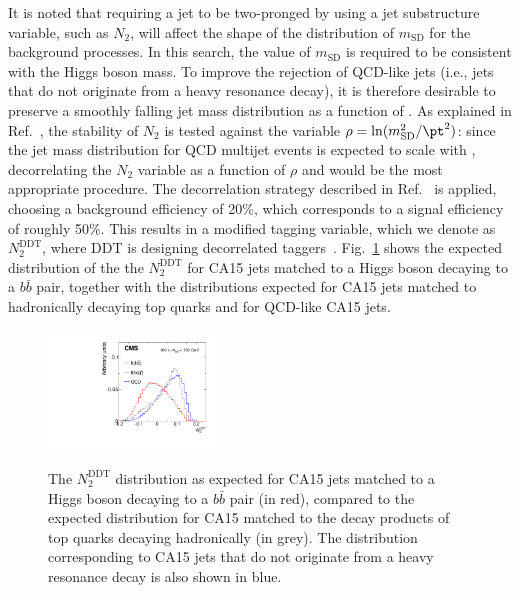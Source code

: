 It is noted that requiring a jet to be two-pronged by using a jet substructure variable,
such as $N_2$, will affect the shape of the distribution of $m_\text{SD}$ for the
background processes. In this search, the value of $m_\text{SD}$ is required to be consistent with the Higgs boson mass.
To improve the rejection of QCD-like jets (i.e., jets that
do not originate from a heavy resonance decay), it is therefore desirable to preserve a smoothly falling jet mass
distribution  as a function of \pt. As explained in
Ref.~\cite{ddt}, the stability of $N_2$ is tested against the variable
$\rho=\ln(m_{\text{SD}}^2/\pt^2)$: since the jet mass distribution for QCD multijet
events is expected to scale with \pt, decorrelating the $N_2$ variable
as a function of $\rho$ and \pt would be the most appropriate procedure. The
decorrelation strategy described in Ref.~\cite{ddt} is applied,
choosing a background efficiency of 20\%, which corresponds to a
signal efficiency of roughly 50\%. This results in a modified tagging
variable, which we denote as $N_2^\text{DDT}$, where DDT is designing decorrelated taggers~\cite{ddt}. Fig.~\ref{n2ddt} shows the expected distribution of the the $N_2^\text{DDT}$ for CA15 jets matched to a Higgs boson decaying to a $b\bar{b}$ pair, together with the distributions expected for CA15 jets matched to hadronically decaying top quarks and for QCD-like CA15 jets.
\begin{figure}
\centering
  \includegraphics[width=0.4\textwidth]{figures/ddt_N2DDT_ns.pdf} \\
\caption{The $N_2^\text{DDT}$ distribution as expected for CA15 jets matched to a Higgs boson decaying to a $b\bar{b}$ pair (in red), compared to the expected distribution for CA15 matched to the decay products of top quarks decaying hadronically (in grey). The distribution corresponding to CA15 jets that do not originate from a heavy resonance decay is also shown in blue.}
\label{n2ddt}
\end{figure}


